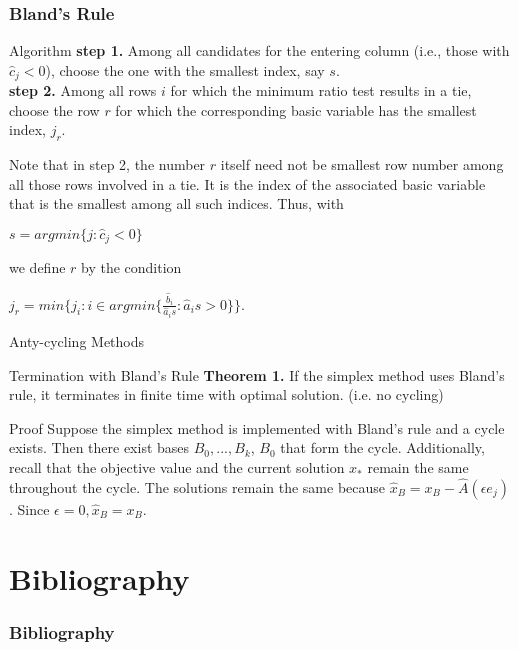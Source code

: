 \documentclass{beamer}
\begin{document}
\begin{frame}\frametitle{Bland's Rule}
\begin{block}{Algorithm}
\textbf{step 1.} Among all candidates for the entering column (i.e., those with $\widehat{c}_j < 0$), choose the one with the smallest index, say $s$. \\
\textbf{step 2.}  Among all rows $i$ for which the minimum ratio test results in a tie, choose the row $r$ for which the corresponding basic variable has the smallest index, $j_r$.
\end{block}
\begin{block}{}
Note that in step 2, the number $r$ itself need not be smallest row number among all those rows involved in a tie. It is the index of the associated basic variable that is the smallest among all such indices. Thus, with \\
\centerline{$s = arg min \lbrace j : \widehat{c}_j < 0 \rbrace$}
we define $r$ by the condition \\
\centerline{$j_r = min \lbrace j_i : i \in arg min \lbrace \frac{\widehat{b}_i}{\widehat{a}_is} : \widehat{a}_is > 0 \rbrace \rbrace$.}
\end{block}
\end{frame}

\begin{frame}{Anty-cycling Methods}
\begin{block}{Termination with Bland's Rule}
\textbf{Theorem 1.} If the simplex method uses Bland's rule, it terminates in finite time with optimal solution. (i.e. no cycling)
\end{block}
\begin{block}{Proof}
Suppose the simplex method is implemented with Bland's rule and a cycle exists. Then there exist bases $B_0, ... ,B_k$, $B_0$ that form the cycle. Additionally, recall that the objective value and the current solution $x_*$ remain the same throughout the cycle. The solutions remain the same because $\widehat{x}_B = x_B - \widehat{A}(\epsilon e_j)$. Since $\epsilon = 0, \widehat{x}_B = x_B$.
\end{block}
\end{frame}

\section{Bibliography}
\begin{frame}[allowframebreaks]
\frametitle{Bibliography}
    \tiny{ }
    
\end{frame}
\end{document}
